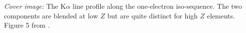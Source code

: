 \documentclass[12pt]{book}
\begin{document}
\clearpage

\vspace{5mm}
\noindent
{\small {\em Cover image:}
The K$\alpha$ line profile along the one-electron iso-sequence.
The two components are blended at low $Z$ but are quite distinct
for high $Z$ elements.
Figure 5 from \citet{2024arXiv241201606G}.
}
\clearpage

\tableofcontents
\listoffigures
\listoftables

\clearpage
\mainmatter

\backmatter


\end{document}

